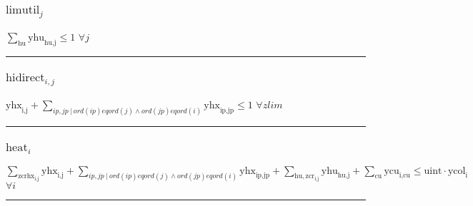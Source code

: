 \documentclass[11pt]{article}
\begin{document}
\subsubsection*{\begin{math}\text{limutil}_{j}\end{math}}
\begin{math}
\displaystyle \sum_{\text{hu}} \text{yhu}_{\text{hu},\text{j}} \leq 1
\end{math}
\hfill
\begin{math}
\forall j
\end{math}\vspace{5pt}
\hrule
\subsubsection*{\begin{math}\text{hidirect}_{i,j}\end{math}}
\begin{math}
\text{yhx}_{\text{i},\text{j}} + \displaystyle \sum_{ip,jp ~ | ~ ord(ip) eq ord(j) \wedge ord(jp) eq ord(i)} \text{yhx}_{\text{ip},\text{jp}} \leq 1
\end{math}
\hfill
\begin{math}
\forall zlim
\end{math}\vspace{5pt}
\hrule
\subsubsection*{\begin{math}\text{heat}_{i}\end{math}}
\begin{math}
\displaystyle \sum_{\text{zcrhx}_{\text{i},\text{j}}} \text{yhx}_{\text{i},\text{j}} + \displaystyle \sum_{ip,jp ~ | ~ ord(ip) eq ord(j) \wedge ord(jp) eq ord(i)} \text{yhx}_{\text{ip},\text{jp}} + \displaystyle \sum_{\text{hu},\text{zcr}_{\text{i},\text{j}}} \text{yhu}_{\text{hu},\text{j}} + \displaystyle \sum_{\text{cu}} \text{ycu}_{\text{i},\text{cu}} \leq \text{uint} \cdot \text{ycol}_{\text{i}}
\end{math}
\hfill
\begin{math}
\forall i
\end{math}\vspace{5pt}
\hrule
\end{document}

